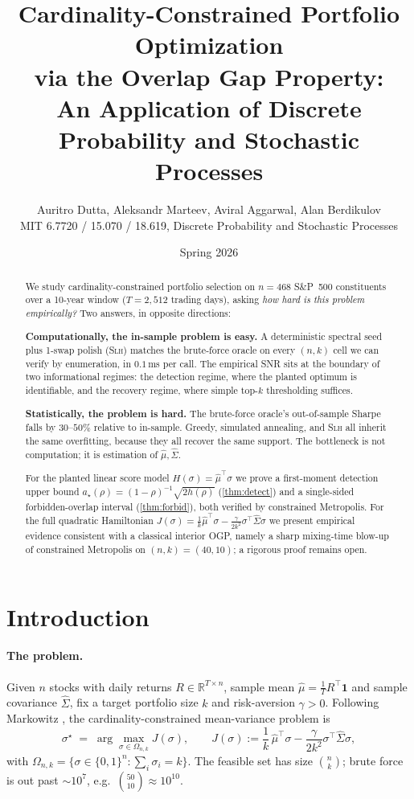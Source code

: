 \documentclass[11pt]{article}
\title{Cardinality-Constrained Portfolio Optimization \\
  via the Overlap Gap Property: \\
  An Application of Discrete Probability and Stochastic Processes}
\author{Auritro Dutta, Aleksandr Marteev, Aviral Aggarwal, Alan Berdikulov \\
  MIT 6.7720 / 15.070 / 18.619, Discrete Probability and Stochastic Processes}
\date{Spring 2026}
\begin{document}
\maketitle

\begin{abstract}
We study cardinality-constrained portfolio selection on $n=468$ S\&P~500 constituents
over a 10-year window ($T=2{,}512$ trading days), asking \emph{how hard is this problem
empirically?} Two answers, in opposite directions:

\textbf{Computationally, the in-sample problem is easy.} A deterministic spectral seed
plus 1-swap polish (\textsc{Slh}) matches the brute-force oracle on every $(n,k)$ cell we
can verify by enumeration, in $0.1$\,ms per call. The empirical SNR sits at the boundary
of two informational regimes: the detection regime, where the planted optimum is
identifiable, and the recovery regime, where simple top-$k$ thresholding suffices.

\textbf{Statistically, the problem is hard.} The brute-force oracle's out-of-sample
Sharpe falls by $30$--$50\%$ relative to in-sample. Greedy, simulated annealing, and
\textsc{Slh} all inherit the same overfitting, because they all recover the same
support. The bottleneck is not computation; it is estimation of $\hat\mu,\hat\Sigma$.

For the planted linear score model $H(\sigma)=\hat\mu^\top\sigma$ we prove a first-moment
detection upper bound $a_\star(\rho)= (1-\rho)^{-1}\sqrt{2 h(\rho)}$
(\cref{thm:detect}) and a single-sided forbidden-overlap interval
(\cref{thm:forbid}), both verified by constrained Metropolis. For the full quadratic
Hamiltonian $J(\sigma)=\tfrac{1}{k}\hat\mu^\top\sigma-\tfrac{\gamma}{2k^2}\sigma^\top
\hat\Sigma\sigma$ we present empirical evidence consistent with a classical interior
OGP, namely a sharp mixing-time blow-up of constrained Metropolis on $(n,k)=(40,10)$;
a rigorous proof remains open.
\end{abstract}

\section{Introduction}\label{sec:intro}

\paragraph{The problem.} Given $n$ stocks with daily returns $R\in\mathbb R^{T\times n}$,
sample mean $\hat\mu = \tfrac1T R^\top\mathbf 1$ and sample covariance $\hat\Sigma$, fix a
target portfolio size $k$ and risk-aversion $\gamma>0$. Following Markowitz \cite{markowitz},
the cardinality-constrained mean-variance problem is
\begin{equation}\label{eq:problem-intro}
  \sigma^\star \;=\; \arg\max_{\sigma\in\Omega_{n,k}} J(\sigma),
  \qquad J(\sigma) := \frac{1}{k}\,\hat\mu^\top\sigma - \frac{\gamma}{2k^2}\sigma^\top\hat\Sigma\sigma,
\end{equation}
with $\Omega_{n,k}=\{\sigma\in\{0,1\}^n:\sum_i\sigma_i=k\}$. The feasible set has size
$\binom{n}{k}$; brute force is out past $\sim\!10^7$, e.g.\ $\binom{50}{10}\approx 10^{10}$.
\end{document}
